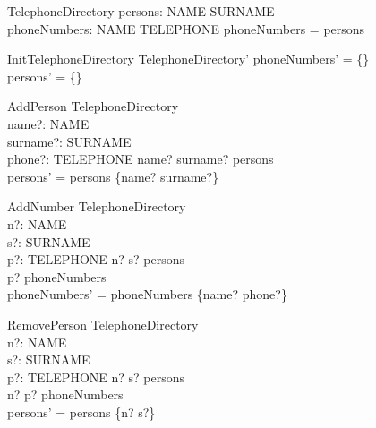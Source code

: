 \documentclass{article}
\begin{document}
\begin{zed}
[NAME] 
\end{zed}

\begin{zed}
[SURNAME]
\end{zed}

\begin{zed}
[TELEPHONE]
\end{zed}

\begin{schema}{TelephoneDirectory}
persons: NAME \fun SURNAME \\ 
phoneNumbers: NAME \pfun TELEPHONE
\where 
\dom phoneNumbers = \dom persons
\end{schema}

\begin{schema}{InitTelephoneDirectory} 
TelephoneDirectory'
\where 
phoneNumbers' = \{\} \\
persons' = \{\}
\end{schema}

\begin{schema}{AddPerson}
\Delta TelephoneDirectory \\
name?: NAME \\
surname?: SURNAME \\
phone?: TELEPHONE
\where
name? \mapsto surname? \notin persons\\
persons' = persons \cup \{name? \mapsto surname?\}
\end{schema}

\begin{schema}{AddNumber}
\Delta TelephoneDirectory \\
n?: NAME \\
s?: SURNAME \\
p?: TELEPHONE
\where
n? \mapsto s? \in persons \\
p? \notin \ran phoneNumbers \\
phoneNumbers' = phoneNumbers \cup \{name? \mapsto phone?\}
\end{schema}

\begin{schema}{RemovePerson}
\Delta TelephoneDirectory \\
n?: NAME \\
s?: SURNAME \\
p?: TELEPHONE
\where
n? \mapsto s? \in persons\\
n? \mapsto p? \notin phoneNumbers \\
persons' = persons \setminus \{n? \mapsto s?\}
\end{schema}
\end{document}
